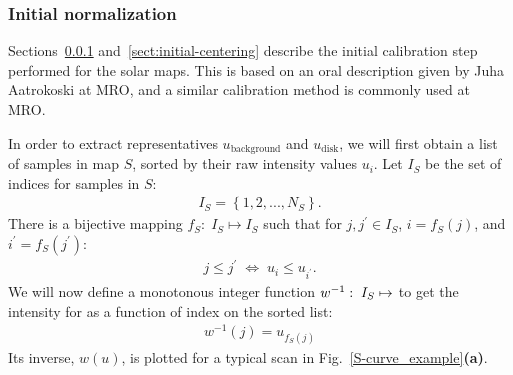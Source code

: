 \documentclass{aa}
\newcommand{\skk}[1]{\textcolor{midorange}{[SKK: #1]}} %
\newcommand{\eqnl}[2]{\begin{eqnarray}\label{#1}#2\end{eqnarray}}
\newcommand{\s}[2]{{#1}_{\mathrm{#2}}}
\begin{document}
  \subsubsection{Initial normalization}\label{sect:s-curve}

  Sections~\ref{sect:s-curve} and~\ref{sect:initial-centering} describe the initial calibration step performed for the solar maps. This is based on an oral description 
  given by Juha Aatrokoski at MRO, and a similar calibration method is commonly used at MRO.
   
  In order to extract representatives $\s{u}{background}$ and $\s{u}{disk}$, we will first obtain a list of samples in map $S$, sorted by their raw intensity values $u_i$. Let $I_S$ be the set of indices for samples in $S$:
  \eqnl{S-curve_indices}{
  I_S = \left\{ 1, 2, ..., N_S \right\} \text{.}
  }
  There is a bijective mapping $f_S:\; I_S \mapsto I_S$ such that for $j,j^{\prime} \in I_S$, $i = f_S(j)$, and $i^{\prime} = f_S(j^{\prime})$:
  \eqnl{scurve-mapping1}{
  j \le j^{\prime} \; \Leftrightarrow \; u_{i} \le u_{i^{\prime}} \text{.}
  }
  We will now define a monotonous integer function $w^{-1}:\; I_S \mapsto \real$ to get the intensity for as a function of index on the sorted list:
  \eqnl{scurve-inverse}{
  w^{-1}(j) = u_{f_S(j)}
  }
  Its inverse, $w(u)$, is plotted for a typical scan in Fig.~\ref{S-curve_example}{\bf(a)}. 


\end{document}
